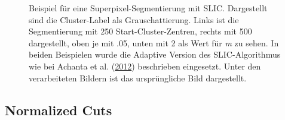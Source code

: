 \documentclass[
  12pt,
  openany]{book}
\begin{document}
\begin{figure}
{}

\caption[Beispiel für eine Superpixel-Segmentierung mit SLIC.]{Beispiel für eine Superpixel-Segmentierung mit SLIC. Dargestellt sind die Cluster-Label als Grauschattierung. Links ist die Segmentierung mit 250 Start-Cluster-Zentren, rechts mit 500 dargestellt, oben je mit .05, unten mit 2 als Wert für \emph{m} zu sehen. In beiden Beispielen wurde die Adaptive Version des SLIC-Algorithmus wie bei Achanta et al. (\protect\hyperlink{ref-achantaSLICSuperpixelsCompared2012}{2012}) beschrieben eingesetzt. Unter den verarbeiteten Bildern ist das ursprüngliche Bild dargestellt.}\label{fig:slicExample}
\end{figure}

\hypertarget{normalized-cuts}{%
\subsection{Normalized Cuts}\label{normalized-cuts}}
\end{document}
